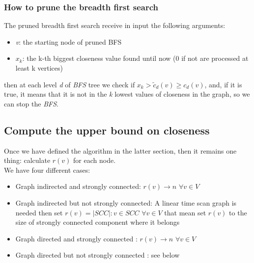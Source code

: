 \subsubsection{How to prune the breadth first search}
The pruned breadth first search receive in input the following arguments:
\begin{itemize}
	\item \textit{v}: the starting node of pruned BFS
	\item $ x_k $: the k-th biggest closeness value found until now (0 if not are processed at least k vertices)
\end{itemize}
then at each level \textit{d} of \textit{BFS} tree we check if $ x_k >  \tilde{c}_d(v)  \geq c_d(v)  $, and, if it is true, it means that it is not in the \textit{k} lowest values of closeness in the graph, so we can stop the \textit{BFS}.
\subsection{Compute the upper bound on closeness}
Once we have defined the algorithm in the latter section, then it remains one thing: calculate $ r(v) $ for each node.\\
We have four different cases:
\begin{itemize}
	\item Graph indirected and strongly connected: $ r(v) \rightarrow n \,\,\forall v \in V $
	\item  Graph indirected but not strongly connected: A linear time scan graph is needed then set $ r(v) = |SCC| : v \in SCC \,\, \forall v \in V $ that mean set $ r(v) $ to the size of strongly connected component where it belongs
	\item Graph directed and strongly connected :  $ r(v) \rightarrow n \,\,\forall v \in V $
	\item Graph directed but not strongly connected : see below
\end{itemize}
